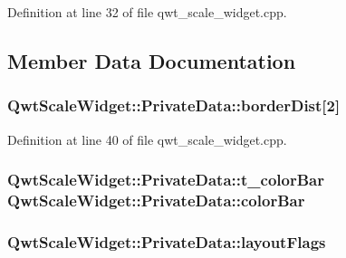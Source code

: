 Definition at line 32 of file qwt\-\_\-scale\-\_\-widget.\-cpp.



\subsection{Member Data Documentation}
\hypertarget{class_qwt_scale_widget_1_1_private_data_a361e6813e0f14c687bd8776e6ce47fac}{
\subsubsection[{border\-Dist}]{ Qwt\-Scale\-Widget\-::\-Private\-Data\-::border\-Dist\mbox{[}2\mbox{]}}}\label{class_qwt_scale_widget_1_1_private_data_a361e6813e0f14c687bd8776e6ce47fac}


Definition at line 40 of file qwt\-\_\-scale\-\_\-widget.\-cpp.

\hypertarget{class_qwt_scale_widget_1_1_private_data_ab230f5ffb19eb5d9177e68e6a1da6967}{
\subsubsection[{color\-Bar}]{ {\bf Qwt\-Scale\-Widget\-::\-Private\-Data\-::t\-\_\-color\-Bar}  Qwt\-Scale\-Widget\-::\-Private\-Data\-::color\-Bar}}\label{class_qwt_scale_widget_1_1_private_data_ab230f5ffb19eb5d9177e68e6a1da6967}
\hypertarget{class_qwt_scale_widget_1_1_private_data_acb2232569889ad50dc3e26ed7b1d84bc}{
\subsubsection[{layout\-Flags}]{ Qwt\-Scale\-Widget\-::\-Private\-Data\-::layout\-Flags}}\label{class_qwt_scale_widget_1_1_private_data_acb2232569889ad50dc3e26ed7b1d84bc}


